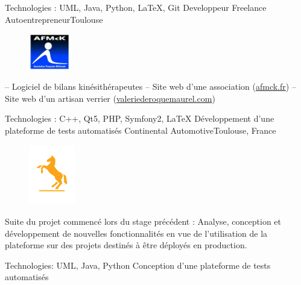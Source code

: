 \documentclass{my_cv_bis} \usepackage{wrapfig}
\begin{document}
{
	Technologies : UML, Java, Python, \LaTeX, Git 
	\vspace{15px}
}
	{Developpeur Freelance}
	{Autoentrepreneur}{Toulouse}
	{
	\vspace{-0.4cm}
	\begin{figure}
		\vspace{-0.4cm}
		\includegraphics[width=1.8cm]{images/logos/afmck.jpg}
	\end{figure}	
		-- Logiciel de bilans kinésithérapeutes\newline
		-- Site web d'une association (\url{afmck.fr})\newline
		-- Site web d'un artisan verrier (\url{valeriederoquemaurel.com})\newline
	}
	{
	Technologies : C++, Qt5, PHP, Symfony2, \LaTeX{}
	\vspace{15px}
	}
	\vspace{15px}
	{Développement d'une plateforme de tests automatisés}
	{Continental Automotive}{Toulouse, France}
	{
	\begin{minipage}{0.85\textwidth}
	\begin{figure}
		\vspace{-1cm}
		\includegraphics[width=2cm]{images/logos/continental.png}
	\end{figure}	
	Suite du projet commencé lors du stage précédent : Analyse, conception et développement de nouvelles fonctionnalités en vue de l'utilisation
	de la plateforme sur des projets destinés à être déployés en production. 
	\end{minipage}
	}
	{Technologies: UML, Java, Python}
	\vspace{15px}
	{Conception d'une plateforme de tests automatisés}
\end{document}
